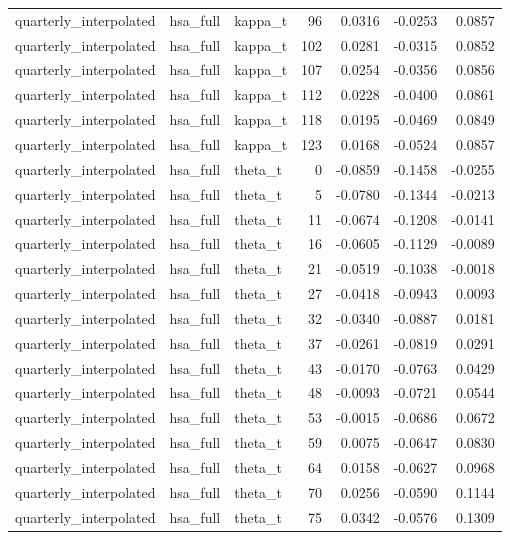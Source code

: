 \begin{tabular}{lllrrrr}
quarterly\_interpolated & hsa\_full & kappa\_t & 96 & 0.0316 & -0.0253 & 0.0857 \\
quarterly\_interpolated & hsa\_full & kappa\_t & 102 & 0.0281 & -0.0315 & 0.0852 \\
quarterly\_interpolated & hsa\_full & kappa\_t & 107 & 0.0254 & -0.0356 & 0.0856 \\
quarterly\_interpolated & hsa\_full & kappa\_t & 112 & 0.0228 & -0.0400 & 0.0861 \\
quarterly\_interpolated & hsa\_full & kappa\_t & 118 & 0.0195 & -0.0469 & 0.0849 \\
quarterly\_interpolated & hsa\_full & kappa\_t & 123 & 0.0168 & -0.0524 & 0.0857 \\
quarterly\_interpolated & hsa\_full & theta\_t & 0 & -0.0859 & -0.1458 & -0.0255 \\
quarterly\_interpolated & hsa\_full & theta\_t & 5 & -0.0780 & -0.1344 & -0.0213 \\
quarterly\_interpolated & hsa\_full & theta\_t & 11 & -0.0674 & -0.1208 & -0.0141 \\
quarterly\_interpolated & hsa\_full & theta\_t & 16 & -0.0605 & -0.1129 & -0.0089 \\
quarterly\_interpolated & hsa\_full & theta\_t & 21 & -0.0519 & -0.1038 & -0.0018 \\
quarterly\_interpolated & hsa\_full & theta\_t & 27 & -0.0418 & -0.0943 & 0.0093 \\
quarterly\_interpolated & hsa\_full & theta\_t & 32 & -0.0340 & -0.0887 & 0.0181 \\
quarterly\_interpolated & hsa\_full & theta\_t & 37 & -0.0261 & -0.0819 & 0.0291 \\
quarterly\_interpolated & hsa\_full & theta\_t & 43 & -0.0170 & -0.0763 & 0.0429 \\
quarterly\_interpolated & hsa\_full & theta\_t & 48 & -0.0093 & -0.0721 & 0.0544 \\
quarterly\_interpolated & hsa\_full & theta\_t & 53 & -0.0015 & -0.0686 & 0.0672 \\
quarterly\_interpolated & hsa\_full & theta\_t & 59 & 0.0075 & -0.0647 & 0.0830 \\
quarterly\_interpolated & hsa\_full & theta\_t & 64 & 0.0158 & -0.0627 & 0.0968 \\
quarterly\_interpolated & hsa\_full & theta\_t & 70 & 0.0256 & -0.0590 & 0.1144 \\
quarterly\_interpolated & hsa\_full & theta\_t & 75 & 0.0342 & -0.0576 & 0.1309 \\

\end{tabular}
